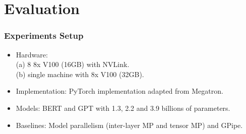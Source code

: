 \documentclass[12pt,aspectratio=169]{beamer}
\begin{document}
    \section{Evaluation}

    \begin{frame}
        \frametitle{Experiments Setup}

        \begin{itemize}
            \setlength{\itemsep}{.8em}
            \item Hardware: \\ (a) 8 8x V100 (16GB) with NVLink. \\ (b) single machine with 8x V100 (32GB).
            \item Implementation: PyTorch implementation adapted from Megatron.
            \item Models: BERT and GPT with 1.3, 2.2 and 3.9 billions of parameters.
            \item Baselines: Model parallelism (inter-layer MP and tensor MP) and GPipe.
        \end{itemize}
    \end{frame}

\end{document}
